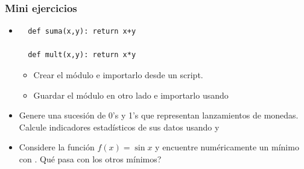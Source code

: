 \documentclass[14pt,aspectratio=169,xcolor=dvipsnames]{beamer}
\begin{document}
\begin{frame}
    \maketitle
\end{frame}
\begin{frame}\frametitle{Mini ejercicios}
    \begin{itemize}
        \item 
    \begin{verbatim}
  def suma(x,y): return x+y

  def mult(x,y): return x*y
    \end{verbatim}

    \begin{itemize}
        \item Crear el módulo  e importarlo desde un script.
        \item Guardar el módulo en otro lado e importarlo usando 
    \end{itemize}

    \item Genere una sucesión de 0's y 1's que representan lanzamientos de monedas. Calcule indicadores estadísticos de sus datos usando  y 
    \item Considere la función $f(x)=\sin x$ y encuentre numéricamente un mínimo con . Qué pasa con los otros mínimos? 
    \end{itemize}
\end{frame}
\end{document}
